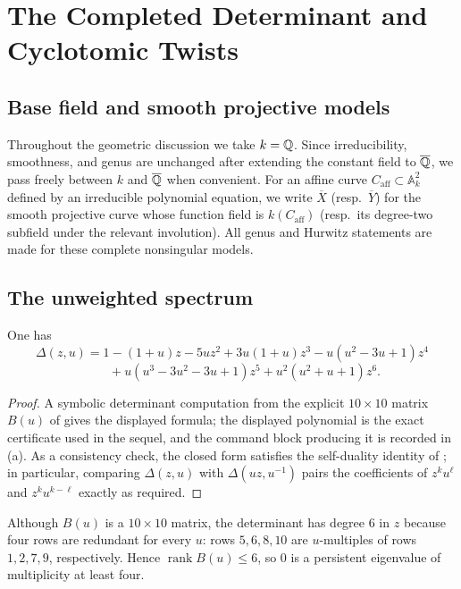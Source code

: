 \section{The Completed Determinant and Cyclotomic Twists}
\label{sec:completion-twists}

\subsection*{Base field and smooth projective models}

Throughout the geometric discussion we take \(k=\mathbb{Q}\). Since
irreducibility, smoothness, and genus are unchanged after extending the
constant field to \(\overline{\mathbb{Q}}\), we pass freely between \(k\) and
\(\overline{\mathbb{Q}}\) when convenient. For an affine curve
\(C_{\mathrm{aff}}\subset\mathbb{A}^2_k\) defined by an irreducible
polynomial equation, we write \(\overline{X}\) (resp.\ \(\overline{Y}\))
for the smooth projective curve whose function field is
\(k(C_{\mathrm{aff}})\) (resp.\ its degree-two subfield under the
relevant involution). All genus and Hurwitz statements are made for
these complete nonsingular models.

\subsection{The unweighted spectrum}

\begin{proposition}\label{prop:kernel-delta-explicit}
One has
\[
  \Delta(z,u)
  =1-(1+u)z-5uz^2+3u(1+u)z^3-u(u^2-3u+1)z^4
\]
\[
  \qquad
  +u(u^3-3u^2-3u+1)z^5+u^2(u^2+u+1)z^6.
\]
\end{proposition}

\begin{proof}
A symbolic determinant computation from the explicit \(10\times 10\)
matrix \(B(u)\) of  gives the displayed formula;
the displayed polynomial is the exact certificate used in the sequel,
and the command block producing it is recorded in
\,\textup{(a)}.
As a consistency check, the closed form satisfies the self-duality
identity of ; in particular, comparing
\(\Delta(z,u)\) with \(\Delta(uz,u^{-1})\) pairs the coefficients of
\(z^k u^\ell\) and \(z^k u^{k-\ell}\) exactly as required.
\end{proof}

Although \(B(u)\) is a \(10\times 10\) matrix, the determinant has
degree \(6\) in \(z\) because four rows are redundant for every \(u\):
rows \(5,6,8,10\) are \(u\)-multiples of rows \(1,2,7,9\),
respectively. Hence \(\operatorname{rank} B(u)\le 6\), so \(0\) is a
persistent eigenvalue of multiplicity at least four.

